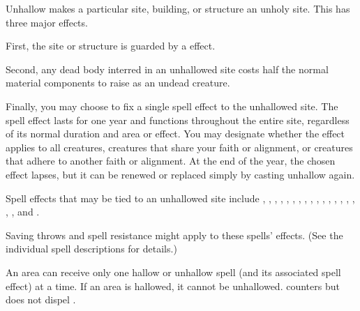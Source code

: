 \begin{spelleffect}
Unhallow makes a particular site, building, or structure an unholy site. This has three major effects.
\par First, the site or structure is guarded by a  effect.
\par Second, any dead body interred in an unhallowed site costs half the normal material components to raise as an undead creature.
\par Finally, you may choose to fix a single spell effect to the unhallowed site. The spell effect lasts for one year and functions throughout the entire site, regardless of its normal duration and area or effect. You may designate whether the effect applies to all creatures, creatures that share your faith or alignment, or creatures that adhere to another faith or alignment. At the end of the year, the chosen effect lapses, but it can be renewed or replaced simply by casting unhallow again.
\par Spell effects that may be tied to an unhallowed site include , , , , , , , , , , , , , , , , , , and .
\par Saving throws and spell resistance might apply to these spells' effects. (See the individual spell descriptions for details.)
\end{spelleffect}
\begin{spellnotes}
An area can receive only one hallow or unhallow spell (and its associated spell effect) at a time. If an area is hallowed, it cannot be unhallowed.  counters but does not dispel .
\end{spellnotes}

